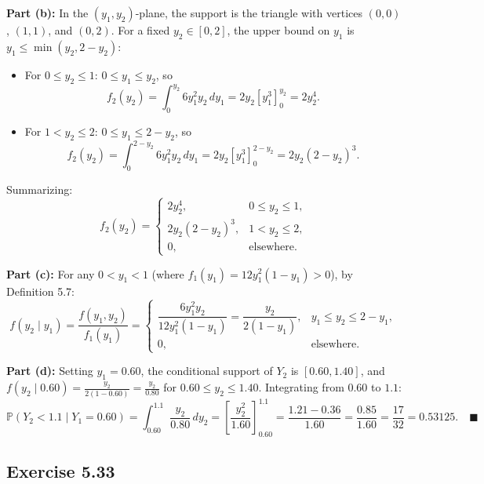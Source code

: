 \documentclass[11pt, letterpaper]{article}
\theoremstyle{definition}
\theoremstyle{remark}
\newcommand{\Prob}{\mathbb{P}}
\begin{document}
\textbf{Part (b):} In the $(y_1, y_2)$-plane, the support is the triangle with vertices $(0, 0)$, $(1, 1)$, and $(0, 2)$. For a fixed $y_2 \in [0, 2]$, the upper bound on $y_1$ is $y_1 \le \min(y_2, 2 - y_2)$:
\begin{itemize}
    \item For $0 \le y_2 \le 1$: $0 \le y_1 \le y_2$, so
    \[ f_2(y_2) = \int_0^{y_2} 6y_1^2 y_2 \, dy_1 = 2y_2 \left[ y_1^3 \right]_0^{y_2} = 2y_2^4. \]
    \item For $1 < y_2 \le 2$: $0 \le y_1 \le 2 - y_2$, so
    \[ f_2(y_2) = \int_0^{2 - y_2} 6y_1^2 y_2 \, dy_1 = 2y_2 \left[ y_1^3 \right]_0^{2 - y_2} = 2y_2(2 - y_2)^3. \]
\end{itemize}
Summarizing:
\[ f_2(y_2) = \begin{cases} 2y_2^4, & 0 \le y_2 \le 1, \\ 2y_2(2 - y_2)^3, & 1 < y_2 \le 2, \\ 0, & \text{elsewhere.} \end{cases} \]

\textbf{Part (c):} For any $0 < y_1 < 1$ (where $f_1(y_1) = 12y_1^2(1 - y_1) > 0$), by Definition 5.7:
\[ f(y_2 \mid y_1) = \frac{f(y_1, y_2)}{f_1(y_1)} = \begin{cases} \dfrac{6y_1^2 y_2}{12y_1^2(1 - y_1)} = \dfrac{y_2}{2(1 - y_1)}, & y_1 \le y_2 \le 2 - y_1, \\ 0, & \text{elsewhere.} \end{cases} \]

\textbf{Part (d):} Setting $y_1 = 0.60$, the conditional support of $Y_2$ is $[0.60, 1.40]$, and $f(y_2 \mid 0.60) = \frac{y_2}{2(1 - 0.60)} = \frac{y_2}{0.80}$ for $0.60 \le y_2 \le 1.40$. Integrating from $0.60$ to $1.1$:
\[ \Prob(Y_2 < 1.1 \mid Y_1 = 0.60) = \int_{0.60}^{1.1} \frac{y_2}{0.80} \, dy_2 = \left[ \frac{y_2^2}{1.60} \right]_{0.60}^{1.1} = \frac{1.21 - 0.36}{1.60} = \frac{0.85}{1.60} = \frac{17}{32} = 0.53125. \quad \blacksquare \]

\subsection{Exercise 5.33}
\end{document}
